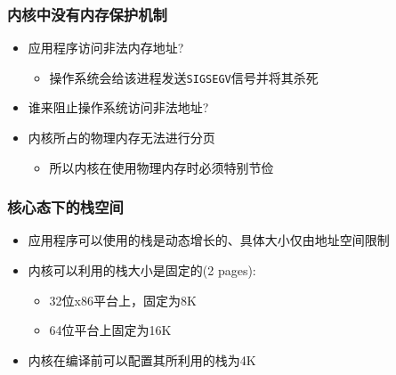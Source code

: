 \documentclass[xcolor=svgnames]{beamer}
\begin{document}
\begin{CJK*}{UTF8}{gbsn}
\begin{frame}[fragile]
\frametitle{内核中没有内存保护机制}
\begin{itemize}
\item 应用程序访问非法内存地址?
\begin{itemize}
\item 操作系统会给该进程发送\verb|SIGSEGV|信号并将其杀死
\end{itemize}
\item 谁来阻止操作系统访问非法地址?
\item 内核所占的物理内存无法进行分页
\begin{itemize}
\item 所以内核在使用物理内存时必须特别节俭
\end{itemize}
\end{itemize}
\end{frame}

\begin{frame}[fragile]
\frametitle{核心态下的栈空间}
\begin{itemize}
\item 应用程序可以使用的栈是动态增长的、具体大小仅由地址空间限制
\item 内核可以利用的栈大小是固定的(2 pages):
\begin{itemize}
\item 32位x86平台上，固定为8K
\item 64位平台上固定为16K
\end{itemize}
\item 内核在编译前可以配置其所利用的栈为4K
\end{itemize}
\end{frame}
\end{CJK*}
\end{document}
